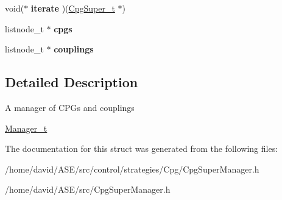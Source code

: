 \begin{CompactItemize}
\item 
\hypertarget{structCpgSuperManager__t_f5beb4b70dea5385c52741a6cd211809}{
void($\ast$ \textbf{iterate} )(\hyperlink{structCpgSuper__t}{CpgSuper\_\-t} $\ast$)}
\label{structCpgSuperManager__t_f5beb4b70dea5385c52741a6cd211809}

\item 
\hypertarget{structCpgSuperManager__t_2216074c95f55ab879f9d6fe509ddc42}{
listnode\_\-t $\ast$ \textbf{cpgs}}
\label{structCpgSuperManager__t_2216074c95f55ab879f9d6fe509ddc42}

\item 
\hypertarget{structCpgSuperManager__t_6e5ce8269e8d908968944155357c499b}{
listnode\_\-t $\ast$ \textbf{couplings}}
\label{structCpgSuperManager__t_6e5ce8269e8d908968944155357c499b}

\end{CompactItemize}


\subsection{Detailed Description}
A manager of CPGs and couplings

\hyperlink{structManager__t}{Manager\_\-t} 

The documentation for this struct was generated from the following files:\begin{CompactItemize}
\item 
/home/david/ASE/src/control/strategies/Cpg/CpgSuperManager.h\item 
/home/david/ASE/src/CpgSuperManager.h\end{CompactItemize}
